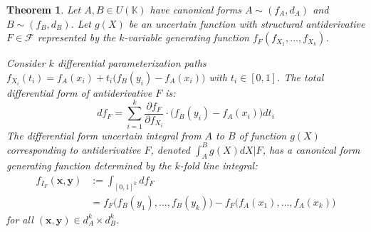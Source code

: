 \documentclass[a4paper,12pt,twoside]{memoir}
\newtheorem{theorem}{Theorem}[chapter]
\begin{document}
	\begin{theorem}
		Let $A, B \in U(\mathbb{K})$ have canonical forms $A \sim (f_A, d_A)$ and $B \sim (f_B, d_B)$. Let $g(X)$ be an uncertain function with structural antiderivative $F \in \mathcal{F}$ represented by the $k$-variable generating function $f_F(f_{X_1}, \dots, f_{X_k})$.
		
		Consider $k$ differential parameterization paths $f_{X_i}(t_i) = f_A(x_i) + t_i\big(f_B(y_i) - f_A(x_i)\big)$ with $t_i \in [0, 1]$. The total differential form of antiderivative $F$ is:
		\[
		d f_F = \sum_{i=1}^{k} \frac{\partial f_F}{\partial f_{X_i}} \cdot \big(f_B(y_i) - f_A(x_i)\big) dt_i
		\]
		The differential form uncertain integral from $A$ to $B$ of function $g(X)$ corresponding to antiderivative $F$, denoted $\int_A^B g(X)dX \Big| F$, has a canonical form generating function determined by the $k$-fold line integral:
		\begin{align*}
			f_{I_F}(\mathbf{x}, \mathbf{y}) &:= \int_{[0, 1]^k} d f_F \\
			&= f_F\big(f_B(y_1), \dots, f_B(y_k)\big) - f_F\big(f_A(x_1), \dots, f_A(x_k)\big)
		\end{align*}
		for all $(\mathbf{x}, \mathbf{y}) \in d_A^k \times d_B^k$.
	\end{theorem}
\end{document}
